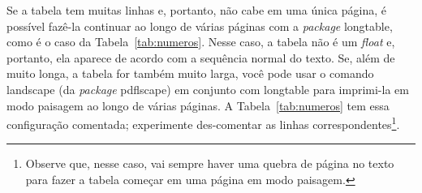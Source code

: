 Se a tabela tem muitas linhas e, portanto, não cabe em uma única página, é
possível fazê-la continuar ao longo de várias páginas com a \textit{package}
\textsf{longtable}, como é o caso da Tabela~\ref{tab:numeros}. Nesse caso,
a tabela não é um \textit{float} e, portanto, ela aparece de acordo com a
sequência normal do texto. Se, além de muito longa, a tabela for também
muito larga, você pode usar o comando \textsf{landscape} (da
\textit{package} \textsf{pdflscape}) em conjunto com \textsf{longtable}
para imprimi-la em modo paisagem ao longo de várias páginas. A
Tabela~\ref{tab:numeros} tem essa configuração comentada; experimente
des-comentar as linhas correspondentes\footnote{Observe que, nesse caso,
vai sempre haver uma quebra de página no texto para fazer a tabela
começar em uma página em modo paisagem.}.


